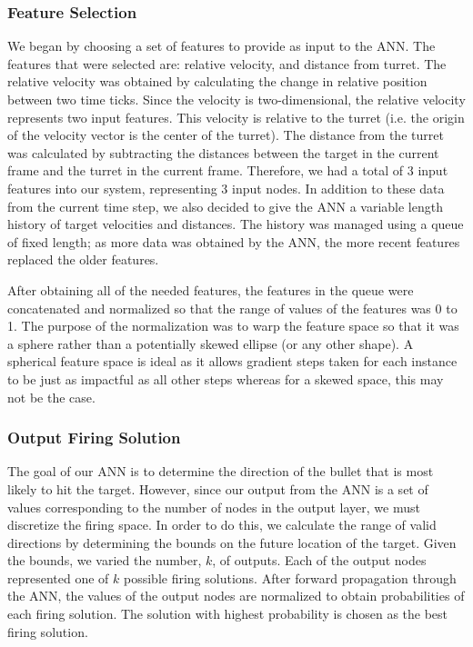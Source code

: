 \documentclass[11pt,letterpaper]{article}
\begin{document}
\subsubsection{Feature Selection}
We began by choosing a set of features to provide as input to the ANN. The features that were selected are: relative velocity, and distance from turret. The relative velocity was obtained by calculating the change in relative position between two time ticks. Since the velocity is two-dimensional, the relative velocity represents two input features. This velocity is relative to the turret (i.e. the origin of the velocity vector is the center of the turret). The distance from the turret was calculated by subtracting the distances between the target in the current frame and the turret in the current frame. Therefore, we had a total of 3 input features into our system, representing 3 input nodes. In addition to these data from the current time step, we also decided to give the ANN a variable length history of target velocities and distances. The history was managed using a queue of fixed length; as more data was obtained by the ANN, the more recent features replaced the older features.

After obtaining all of the needed features, the features in the queue were concatenated and normalized so that the range of values of the features was 0 to 1. The purpose of the normalization was to warp the feature space so that it was a sphere rather than a potentially skewed ellipse (or any other shape). A spherical feature space is ideal as it allows gradient steps taken for each instance to be just as impactful as all other steps whereas for a skewed space, this may not be the case.

\subsubsection{Output Firing Solution}
The goal of our ANN is to determine the direction of the bullet that is most likely to hit the target. However, since our output from the ANN is a set of values corresponding to the number of nodes in the output layer, we must discretize the firing space. In order to do this, we calculate the range of valid directions by determining the bounds on the future location of the target. Given the bounds, we varied the number, $k$, of outputs. Each of the output nodes represented one of $k$ possible firing solutions. After forward propagation through the ANN, the values of the output nodes are normalized to obtain probabilities of each firing solution. The solution with highest probability is chosen as the best firing solution.
\end{document}
